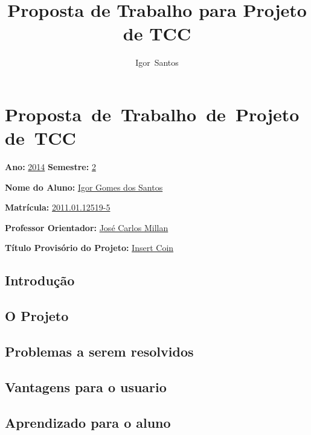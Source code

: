 \documentclass[a4paper]{abnt}
\author{Igor~Santos}
\title{Proposta de Trabalho para Projeto de TCC}
\begin{document}
\maketitle

\chapter{\mbox{Proposta de Trabalho de Projeto de TCC}}

\textbf{Ano:} \underline{2014} \textbf{Semestre:} \underline{2}

\textbf{Nome do Aluno:} \underline{Igor Gomes dos Santos}

\textbf{Matrícula:} \underline{2011.01.12519-5}

\textbf{Professor Orientador:} \underline{José Carlos Millan}

\textbf{Título Provisório do Projeto:} \underline{Insert Coin}



\section{Introdução}


\section{O Projeto}


\section{Problemas a serem resolvidos}


\section{Vantagens para o usuario}


\section{Aprendizado para o aluno}
\end{document}
